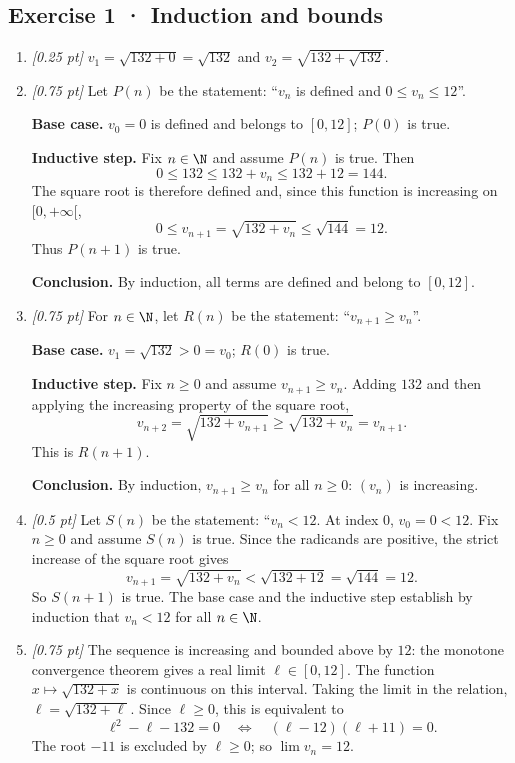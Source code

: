 \subsection*{Exercise 1 · Induction and bounds}\begin{enumerate}

\item \textit{[0.25 pt]} $v_1=\sqrt{132+0}=\sqrt{132}$ and $v_2=\sqrt{132+\sqrt{132}}$.

\item \textit{[0.75 pt]} Let $P(n)$ be the statement: ``$v_n$ is defined and $0\le v_n\le 12$''.
\par\smallskip\textbf{Base case.} $v_0=0$ is defined and belongs to $[0,12]$; $P(0)$ is true.
\par\smallskip\textbf{Inductive step.} Fix $n\in\N$ and assume $P(n)$ is true. Then
\[0\le 132\le 132+v_n\le 132+12=144.\]
The square root is therefore defined and, since this function is increasing on $[0,+\infty[$,
\[0\le v_{n+1}=\sqrt{132+v_n}\le\sqrt{144}=12.\]
Thus $P(n+1)$ is true.
\par\smallskip\textbf{Conclusion.} By induction, all terms are defined and belong to $[0,12]$.

\item \textit{[0.75 pt]} For $n\in\N$, let $R(n)$ be the statement: ``$v_{n+1}\ge v_n$''.
\par\smallskip\textbf{Base case.} $v_1=\sqrt{132}>0=v_0$; $R(0)$ is true.
\par\smallskip\textbf{Inductive step.} Fix $n\ge0$ and assume $v_{n+1}\ge v_n$. Adding $132$ and then applying the increasing property of the square root,
\[v_{n+2}=\sqrt{132+v_{n+1}}\ge\sqrt{132+v_n}=v_{n+1}.\]
This is $R(n+1)$.
\par\smallskip\textbf{Conclusion.} By induction, $v_{n+1}\ge v_n$ for all $n\ge0$: $(v_n)$ is increasing.

\item \textit{[0.5 pt]} Let $S(n)$ be the statement: ``$v_n<12$. At index $0$, $v_0=0<12$.
Fix $n\ge0$ and assume $S(n)$ is true. Since the radicands are positive, the strict increase of the square root gives
\[v_{n+1}=\sqrt{132+v_n}<\sqrt{132+12}=\sqrt{144}=12.\]
So $S(n+1)$ is true. The base case and the inductive step establish by induction that $v_n<12$ for all $n\in\N$.

\item \textit{[0.75 pt]} The sequence is increasing and bounded above by $12$: the monotone convergence theorem gives a real limit $\ell\in[0,12]$.
The function $x\mapsto\sqrt{132+x}$ is continuous on this interval. Taking the limit in the relation, $\ell=\sqrt{132+\ell}$. Since $\ell\ge0$, this is equivalent to
\[\ell^2-\ell-132=0\quad\Longleftrightarrow\quad(\ell-12)(\ell+11)=0.\]
The root $-11$ is excluded by $\ell\ge0$; so $\lim v_n=12$.


\end{enumerate}
